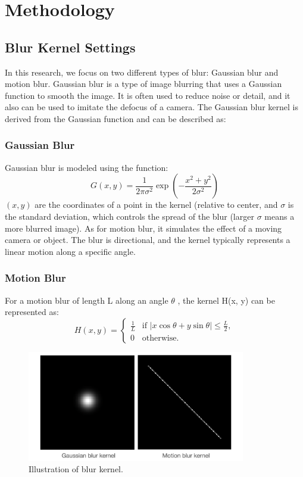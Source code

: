 \documentclass[twoside,11pt]{article}
\begin{document}
\section{Methodology}

\subsection{Blur Kernel Settings}
In this research, we focus on two different types of blur: Gaussian blur and motion blur.
Gaussian blur is a type of image blurring that uses a Gaussian function to smooth the image. It is often used to reduce noise or detail, and it also can be used to imitate the defocus of a camera.
The Gaussian blur kernel is derived from the Gaussian function and can be described as:

\subsubsection{Gaussian Blur}
Gaussian blur is modeled using the function:
\[
G(x, y) = \frac{1}{2\pi\sigma^2} \exp\left(-\frac{x^2 + y^2}{2\sigma^2}\right)
\]
 \( (x, y) \) are the coordinates of a point in the kernel (relative to center, and \( \sigma \) is the standard deviation, which controls the spread of the blur (larger  \( \sigma \) means a more blurred image).
As for motion blur, it simulates the effect of a moving camera or object. The blur is directional, and the kernel typically represents a linear motion along a specific angle.

\subsubsection{Motion Blur}
For a motion blur of length  L  along an angle \(\theta\) , the kernel  H(x, y)  can be represented as:
\[
H(x, y) =
\begin{cases}
\frac{1}{L} & \text{if } |x \cos \theta + y \sin \theta| \leq \frac{L}{2}, \\
0 & \text{otherwise}.
\end{cases}
\]

\begin{figure}[H]
\centering
\includegraphics[width=0.85\textwidth]{figure5.png}
\caption{Illustration of blur kernel.}
\end{figure}
\end{document}
